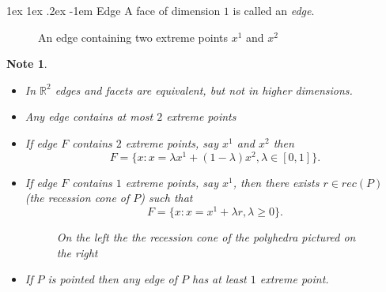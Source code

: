 \documentclass[11pt]{article}
\makeatletter
\renewcommand\paragraph{\@startsection{paragraph}{4}{0mm}%
                                    {1ex \@plus1ex \@minus.2ex}%
                                    {-1em}%
                                    {\normalfont\normalsize\bfseries}}
\newtheorem{note}[fact]{Note}
\newcommand{\R}{\ensuremath{\mathbb R}}
\makeatother
\begin{document}
\paragraph{Edge} A face of dimension $1$ is called an \textit{edge}.
\begin{figure}[ht]
\centering
{}
\caption{An edge containing two extreme points $x^1$ and $x^2$} 
\end{figure}
\begin{note}
\begin{itemize}
\item In $\R^2$ edges and facets are equivalent, but not in higher dimensions.
\item Any edge contains at most $2$ extreme points
\item If edge $F$ contains $2$ extreme points, say $x^1$ and $x^2$ then
$$F = \{ x : x = \lambda x^1 + (1-\lambda)x^2, \lambda \in [0,1]\}.$$
\item If edge $F$ contains $1$ extreme points, say $x^1$, then there exists $r \in rec(P)$ (the recession cone of $P$) such that
$$F = \{x : x = x^1 + \lambda r, \lambda \geq 0 \}.$$
\begin{figure}[ht]
\centering
{}
\caption{On the left the the recession cone of the polyhedra pictured on the right} 
\end{figure}
\item If $P$ is pointed then any edge of $P$ has at least $1$ extreme point.
\end{itemize}
\end{note}
\end{document}
